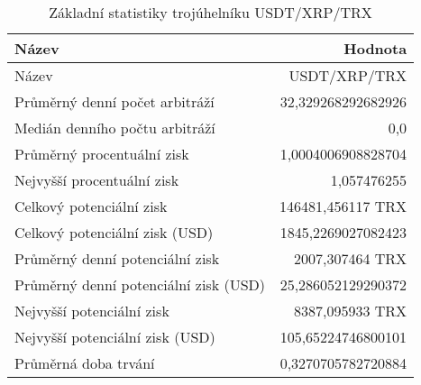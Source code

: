 \begin{table}\centering
\caption{Základní statistiky trojúhelníku USDT/XRP/TRX}
\label{USDTXRPTRX_stats}
\begin{tabular}{|| l | r ||}
\hline Název & Hodnota \\ 
\hline\hline Název & USDT/XRP/TRX \\ 
\hline Průměrný denní počet arbitráží & 32,329268292682926 \\ 
\hline Medián denního počtu arbitráží & 0,0 \\ 
\hline Průměrný procentuální zisk & 1,0004006908828704 \\ 
\hline Nejvyšší procentuální zisk & 1,057476255 \\ 
\hline Celkový potenciální zisk & 146481,456117 TRX \\ 
\hline Celkový potenciální zisk (USD) & 1845,2269027082423 \\ 
\hline Průměrný denní potenciální zisk & 2007,307464 TRX \\ 
\hline Průměrný denní potenciální zisk (USD) & 25,286052129290372 \\ 
\hline Nejvyšší potenciální zisk & 8387,095933 TRX \\ 
\hline Nejvyšší potenciální zisk (USD) & 105,65224746800101 \\ 
\hline Průměrná doba trvání & 0,3270705782720884 \\ 
\hline
\end{tabular}
\end{table}